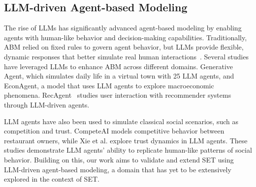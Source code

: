  
\subsection{LLM-driven Agent-based Modeling}


The rise of LLMs has significantly advanced agent-based modeling by enabling agents with human-like behavior and decision-making capabilities. Traditionally, ABM relied on fixed rules to govern agent behavior, but LLMs provide flexible, dynamic responses that better simulate real human interactions~\cite{gao2024large}. Several studies have leveraged LLMs to enhance ABM across different domains. Generative Agent\cite{park2023generative}, which simulates daily life in a virtual town with 25 LLM agents, and EconAgent\cite{li2024econagent}, a model that uses LLM agents to explore macroeconomic phenomena. RecAgent~\cite{wang2023user} studies user interaction with recommender systems through LLM-driven agents.

LLM agents have also been used to simulate classical social scenarios, such as competition and trust. CompeteAI\cite{zhao2023competeai} models competitive behavior between restaurant owners, while Xie et al.\cite{xie2024can} explore trust dynamics in LLM agents. These studies demonstrate LLM agents' ability to replicate human-like patterns of social behavior. Building on this, our work aims to validate and extend SET using LLM-driven agent-based modeling, a domain that has yet to be extensively explored in the context of SET.